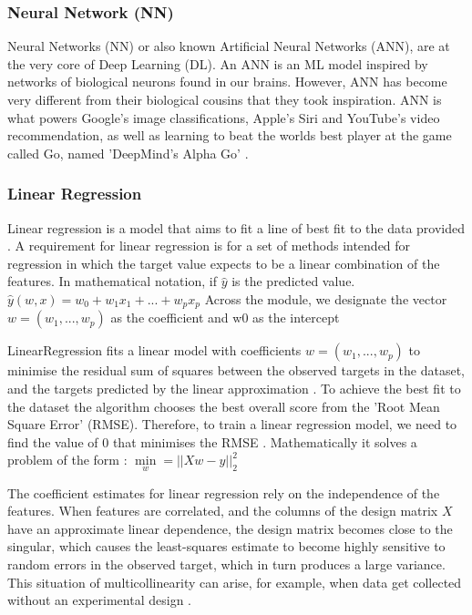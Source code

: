 	\subsubsection{Neural Network (NN)}
	
	Neural Networks (NN) or also known Artificial Neural Networks (ANN), are at the very core of Deep Learning (DL). An ANN is an ML model inspired by networks of biological neurons found in our brains. However, ANN has become very different from their biological cousins that they took inspiration. ANN is what powers Google's image classifications, Apple's Siri and YouTube's video recommendation, as well as learning to beat the worlds best player at the game called Go, named 'DeepMind's Alpha Go' \cite{geron2019hands}.
	
	\subsubsection{Linear Regression}
	Linear regression is a model that aims to fit a line of best fit to the data provided \cite{geron2019hands, sklearn_lr}.  A requirement for linear regression is for a set of methods intended for regression in which the target value expects to be a linear combination of the features. In mathematical notation, if $\hat{y}$ is the predicted value. $\hat{y}(w,x)=w_0+w_1x_1+...+w_px_p$
	Across the module, we designate the vector $w=(w_1,...,w_p)$ as the coefficient and w0 as the intercept \cite{sklearn_lr}
	
	LinearRegression fits a linear model with coefficients $w=(w_1,...,w_p)$ to minimise the residual sum of squares between the observed targets in the dataset, and the targets predicted by the linear approximation \cite{sklearn_lr}. To achieve the best fit to the dataset the algorithm chooses the best overall score from the 'Root Mean Square Error' (RMSE). Therefore, to train a linear regression model, we need to find the value of $0$ that minimises the RMSE \cite{geron2019hands}.
	Mathematically it solves a problem of the form \cite{sklearn_lr}:
	$\min\limits_{w} = ||Xw-y||^2_2$
	
	The coefficient estimates for linear regression rely on the independence of the features. When features are correlated, and the columns of the design matrix $X$ have an approximate linear dependence, the design matrix becomes close to the singular, which causes the least-squares estimate to become highly sensitive to random errors in the observed target, which in turn produces a large variance. This situation of multicollinearity can arise, for example, when data get collected without an experimental design \cite{sklearn_lr, geron2019hands}.
	
